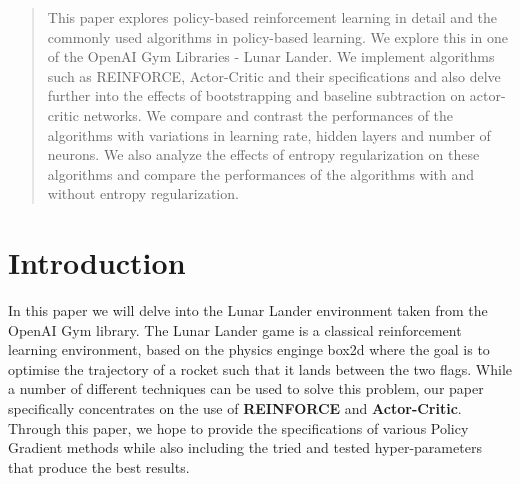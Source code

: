 \documentclass{article}
\begin{document}

\begin{abstract}
This paper explores policy-based reinforcement learning in detail and the commonly used algorithms in policy-based learning. We explore this in one of the OpenAI Gym Libraries - Lunar Lander. We implement algorithms such as REINFORCE, Actor-Critic and their specifications and also delve further into the effects of bootstrapping and baseline subtraction on actor-critic networks. We compare and contrast the performances of the algorithms with variations in learning rate, hidden layers and number of neurons. We also analyze the effects of entropy regularization on these algorithms and compare the performances of the algorithms with and without entropy regularization. 
\end{abstract}

\section {Introduction}
In this paper we will delve into the Lunar Lander environment taken from the OpenAI Gym library. The Lunar Lander game is a classical reinforcement learning environment, based on the physics enginge box2d \cite{brockman2016openai} where the goal is to optimise the trajectory of a rocket such that it lands between the two flags.
 While a number of different techniques can be used to solve this problem, our paper specifically concentrates on the use of  \textbf{REINFORCE} and \textbf{Actor-Critic}. Through this paper, we hope to provide the specifications of various Policy Gradient methods while also including the tried and tested hyper-parameters that produce the best results.%
\end{document}
